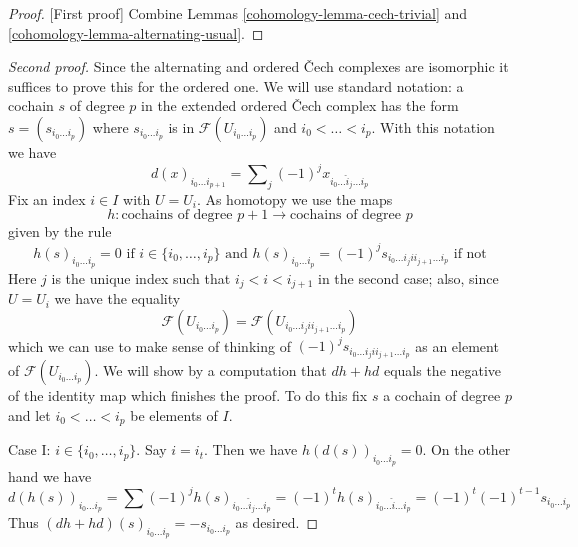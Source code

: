 \begin{proof}
[First proof]
Combine Lemmas \ref{cohomology-lemma-cech-trivial} and \ref{cohomology-lemma-alternating-usual}.
\end{proof}

\begin{proof}[Second proof]
Since the alternating and ordered {\v C}ech complexes are isomorphic
it suffices to prove this for the ordered one.
We will use standard notation: a cochain $s$ of degree $p$
in the extended ordered {\v C}ech complex has the form
$s = (s_{i_0 \ldots i_p})$ where $s_{i_0 \ldots i_p}$ is in
$\mathcal{F}(U_{i_0 \ldots i_p})$ and $i_0 < \ldots < i_p$.
With this notation we have
$$
d(x)_{i_0 \ldots i_{p + 1}} =
\sum\nolimits_j (-1)^j x_{i_0 \ldots \hat i_j \ldots i_p}
$$
Fix an index $i \in I$ with $U = U_i$.
As homotopy we use the maps
$$
h : \text{cochains of degree }p + 1 \to \text{cochains of degree }p
$$
given by the rule
$$
h(s)_{i_0 \ldots i_p} = 0 \text{ if } i \in \{i_0, \ldots, i_p\}
\text{ and }
h(s)_{i_0 \ldots i_p} =
(-1)^j s_{i_0 \ldots i_j i i_{j + 1} \ldots i_p} \text{ if not}
$$
Here $j$ is the unique index such that $i_j < i < i_{j + 1}$ in the
second case; also, since $U = U_i$ we have the equality
$$
\mathcal{F}(U_{i_0 \ldots i_p}) =
\mathcal{F}(U_{i_0 \ldots i_j i i_{j + 1} \ldots i_p})
$$
which we can use to make sense of thinking of
$(-1)^j s_{i_0 \ldots i_j i i_{j + 1} \ldots i_p}$
as an element of $\mathcal{F}(U_{i_0 \ldots i_p})$.
We will show by a computation that $d h + h d$ equals
the negative of the identity map which finishes the proof.
To do this fix $s$ a cochain of degree $p$ and let
$i_0 < \ldots < i_p$ be elements of $I$.

\medskip\noindent
Case I: $i \in \{i_0, \ldots, i_p\}$. Say $i = i_t$. Then we have
$h(d(s))_{i_0 \ldots i_p} = 0$. On the other hand we have
$$
d(h(s))_{i_0 \ldots i_p} =
\sum (-1)^j h(s)_{i_0 \ldots \hat i_j \ldots i_p} =
(-1)^t h(s)_{i_0 \ldots \hat i \ldots i_p} =
(-1)^t (-1)^{t - 1} s_{i_0 \ldots i_p}
$$
Thus $(dh + hd)(s)_{i_0 \ldots i_p} = -s_{i_0 \ldots i_p}$ as desired.


\end{proof}
